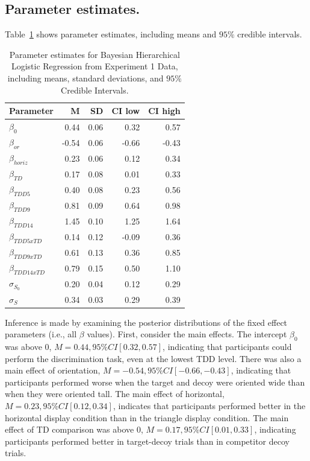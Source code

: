 \subsection{Parameter estimates.}

Table~\ref{tab:e1_params} shows parameter estimates, including means and $95\%$ credible intervals. 
\begin{table}[ht]
    \centering
    \begin{tabular}{l r r r r}
        \toprule
        Parameter & M & SD & CI low & CI high \\
        \midrule
        $\beta_{0}$ & 0.44 & 0.06 & 0.32 & 0.57 \\
        $\beta_{or}$ & -0.54 & 0.06 & -0.66 & -0.43\\
        $\beta_{horiz}$ & 0.23 & 0.06 & 0.12 & 0.34\\
        $\beta_{TD}$ & 0.17 & 0.08 & 0.01 & 0.33\\
        $\beta_{TDD5}$ & 0.40 & 0.08 & 0.23 & 0.56\\
        $\beta_{TDD9}$ & 0.81 & 0.09 & 0.64 & 0.98\\
        $\beta_{TDD14}$ & 1.45 & 0.10 & 1.25 & 1.64\\
        $\beta_{TDD5xTD}$ & 0.14 & 0.12 & -0.09 & 0.36\\
        $\beta_{TDD9xTD}$ & 0.61 & 0.13 & 0.36 & 0.85\\
        $\beta_{TDD14xTD}$ & 0.79 & 0.15 & 0.50 & 1.10\\
        $\sigma_{S_0}$ & 0.20 & 0.04 & 0.12 & 0.29 \\
        $\sigma_{S}$ & 0.34 & 0.03 & 0.29 & 0.39 \\
    \bottomrule 
\end{tabular}
\caption{Parameter estimates for Bayesian Hierarchical Logistic Regression from Experiment 1 Data, including means, standard deviations, and $95\%$ Credible Intervals.}
\label{tab:e1_params}
\end{table}
    
Inference is made by examining the posterior distributions of the fixed effect parameters (i.e., all $\beta$ values). First, consider the main effects. The intercept $\beta_{0}$ was above $0$, $\mathit{M}=0.44, 95\%CI [0.32, 0.57]$, indicating that participants could perform the discrimination task, even at the lowest TDD level. There was also a main effect of orientation, $\mathit{M}=-0.54, 95\%CI [-0.66, -0.43]$, indicating that participants performed worse when the target and decoy were oriented wide than when they were oriented tall. The main effect of horizontal, $\mathit{M}=0.23, 95\%CI [0.12, 0.34]$, indicates that participants performed better in the horizontal display condition than in the triangle display condition. The main effect of TD comparison was above 0, $\mathit{M}=0.17, 95\%CI [0.01, 0.33]$, indicating participants performed better in target-decoy trials than in competitor decoy trials. 
 
